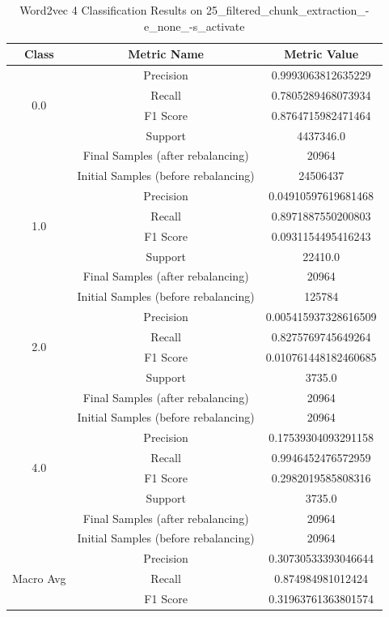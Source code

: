 \begin{longtable}{|c|c|c|}
\caption{Word2vec 4 Classification Results on 25\_filtered\_chunk\_extraction\_-e\_none\_-s\_activate} \label{tab:25_filtered_chunk_extraction_-e_none_-s_activate_word2vec_4_classifiers_results} \\
\hline
Class & Metric Name & Metric Value \\
\hline
\multirow{4}{*}{0.0} & Precision & 0.9993063812635229 \\
 & Recall & 0.7805289468073934 \\
 & F1 Score & 0.8764715982471464 \\
 & Support & 4437346.0 \\
 & Final Samples (after rebalancing) & 20964 \\
 & Initial Samples (before rebalancing) & 24506437 \\
\hline
\multirow{4}{*}{1.0} & Precision & 0.04910597619681468 \\
 & Recall & 0.8971887550200803 \\
 & F1 Score & 0.0931154495416243 \\
 & Support & 22410.0 \\
 & Final Samples (after rebalancing) & 20964 \\
 & Initial Samples (before rebalancing) & 125784 \\
\hline
\multirow{4}{*}{2.0} & Precision & 0.005415937328616509 \\
 & Recall & 0.8275769745649264 \\
 & F1 Score & 0.010761448182460685 \\
 & Support & 3735.0 \\
 & Final Samples (after rebalancing) & 20964 \\
 & Initial Samples (before rebalancing) & 20964 \\
\hline
\multirow{4}{*}{4.0} & Precision & 0.17539304093291158 \\
 & Recall & 0.9946452476572959 \\
 & F1 Score & 0.2982019585808316 \\
 & Support & 3735.0 \\
 & Final Samples (after rebalancing) & 20964 \\
 & Initial Samples (before rebalancing) & 20964 \\
\hline
\multirow{4}{*}{Macro Avg} & Precision & 0.30730533393046644 \\
 & Recall & 0.874984981012424 \\
 & F1 Score & 0.31963761363801574 \\

\end{longtable}
